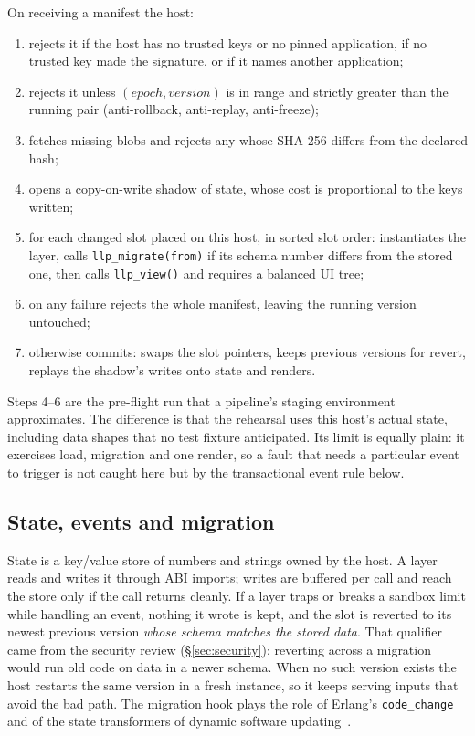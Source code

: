 \documentclass[10pt,twocolumn]{article}
\newcommand{\code}[1]{\texttt{#1}}
\begin{document}
On receiving a manifest the host:
\begin{enumerate}
\item rejects it if the host has no trusted keys or no pinned application, if no trusted key
made the signature, or if it names another application;
\item rejects it unless $(\mathit{epoch},\mathit{version})$ is in range and strictly greater than
the running pair (anti-rollback, anti-replay, anti-freeze);
\item fetches missing blobs and rejects any whose SHA-256 differs from the declared hash;
\item opens a copy-on-write shadow of state, whose cost is proportional to the keys written;
\item for each changed slot placed on this host, in sorted slot order: instantiates the layer,
calls \code{llp\_migrate(from)} if its schema number differs from the stored one, then calls
\code{llp\_view()} and requires a balanced UI tree;
\item on any failure rejects the whole manifest, leaving the running version untouched;
\item otherwise commits: swaps the slot pointers, keeps previous versions for revert, replays the
shadow's writes onto state and renders.
\end{enumerate}

Steps 4--6 are the pre-flight run that a pipeline's staging environment approximates. The
difference is that the rehearsal uses this host's actual state, including data shapes that no test
fixture anticipated. Its limit is equally plain: it exercises load, migration and one render, so a
fault that needs a particular event to trigger is not caught here but by the transactional event
rule below.

\subsection{State, events and migration}

State is a key/value store of numbers and strings owned by the host. A layer reads and writes it
through ABI imports; writes are buffered per call and reach the store only if the call returns
cleanly. If a layer traps or breaks a sandbox limit while handling an event, nothing it wrote is
kept, and the slot is reverted to its newest previous version \emph{whose schema matches the
stored data}. That qualifier came from the security review (\S\ref{sec:security}): reverting
across a migration would run old code on data in a newer schema. When no such version exists the
host restarts the same version in a fresh instance, so it keeps serving inputs that avoid the bad
path. The migration hook plays the role of Erlang's \code{code\_change}~\cite{armstrong2003} and
of the state transformers of dynamic software updating~\cite{hicks2005dsu}.
\end{document}

